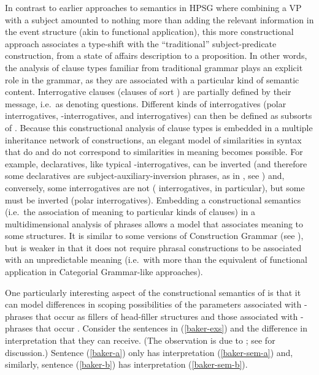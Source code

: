 \documentclass[output=paper
	        ,collection
	        ,collectionchapter
 	        ,biblatex
                ,babelshorthands
                ,newtxmath
                ,draftmode
                ,colorlinks, citecolor=brown
]{langscibook}
\begin{document}
In contrast to earlier approaches to semantics in HPSG where combining a VP with a subject amounted to nothing more than adding the relevant information in the event structure (akin to functional application), this more constructional approach associates a type-shift with the ``traditional'' subject-predicate construction, from a state of affairs description to a proposition. In other words, the analysis of clause types familiar from traditional grammar plays an explicit role in the grammar, as they are associated  with a particular kind of semantic content.  Interrogative clauses (clauses of sort ) are partially defined by their message, i.e.\ as denoting questions. Different kinds of interrogatives (polar interrogatives, -interrogatives, and  interrogatives) can then be defined as subsorts of . Because this constructional analysis of clause types is embedded in a multiple inheritance network of constructions, an elegant model of similarities in syntax that do and do not correspond to similarities in meaning becomes possible. For example,  declaratives, like typical -interrogatives, can be inverted (and therefore some declaratives are subject-auxiliary-inversion phrases, as in , see \citealt{Fillmore1999}) and, conversely, some interrogatives are not ( interrogatives, in particular), but some must be inverted (polar interrogatives). Embedding a constructional semantics (i.e.\ the association of meaning to particular kinds of clauses) in a multidimensional analysis of phrases allows a model that associates meaning to some structures.
It is similar to some versions of Construction Grammar (see ), but is weaker in that it does not require phrasal constructions to be associated with an unpredictable meaning (i.e.\ with more than the equivalent of functional application in Categorial Grammar-like approaches). 

One particularly interesting aspect of the constructional semantics of \citet{GinzburgandSag2001} is that it can model differences in scoping possibilities of the parameters associated with -phrases that occur as fillers of head-filler structures and those associated with -phrases that occur . Consider the sentences in (\ref{baker-exs}) and the difference in interpretation that they can receive. (The observation is due to \citealt{Baker1970a}; see \citealt[242--246]{GinzburgandSag2001} for discussion.) Sentence (\ref{baker-a}) only has interpretation (\ref{baker-sem-a}) and, similarly, sentence (\ref{baker-b}) has interpretation (\ref{baker-sem-b}).
\end{document}
